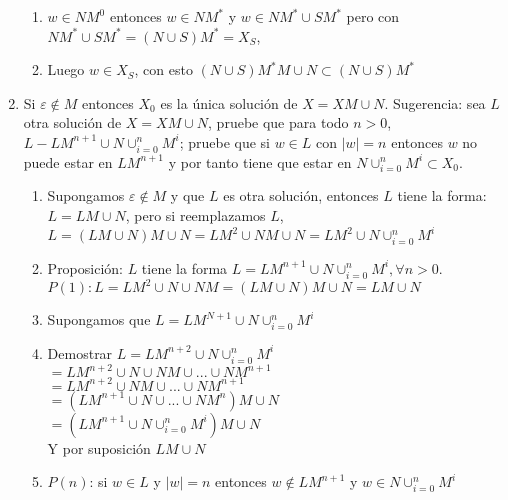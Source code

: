 \documentclass[a4paper, 12pt]{article}
\begin{document}
\begin{enumerate}
\begin{enumerate}[label = -]
        \item $w \in NM^{0}$ entonces $w \in NM^{*}$ y $w \in NM^{*} \cup SM^{*}$ pero con $NM^{*} \cup SM^{*} = (N \cup S)M^{*} = X_{S}$,

        \item Luego $w \in X_{S}$, con esto $(N \cup S)M^{*}M \cup N \subset (N \cup S)M^{*}$
    \end{enumerate}


    \vspace{0.5cm}
\item Si $\varepsilon \notin M$ entonces $X_{0}$ es la única solución de $X = XM \cup N$. Sugerencia: sea $L$ otra solución de $X = XM \cup N$, pruebe que para todo $n > 0$, $L - LM^{n + 1} \cup N \cup^{n}_{i = 0} M^{i}$; pruebe que si $w \in L$ con $|w| = n$ entonces $w$ no puede estar en $LM^{n + 1}$ y por tanto tiene que estar en $N \cup^{n}_{i = 0} M^{i} \subset X_{0}.$
    \begin{enumerate}[label = -]
        \item Supongamos $\varepsilon \notin M$ y que $L$ es otra solución, entonces $L$ tiene la forma:
        \\ $L = LM \cup N$, pero si reemplazamos $L$, $L = (LM \cup N)M \cup N = LM^{2} \cup NM \cup N = LM^{2} \cup N \cup^{n}_{i = 0}M^{i}$
        
        \item Proposición: $L$ tiene la forma $L = LM^{n + 1} \cup N \cup^{n}_{i = 0}M^{i}, \forall n > 0$.
        \\ $P(1): L = LM^{2} \cup N \cup NM = (LM \cup N)M \cup N = LM \cup N$

        \item Supongamos que $L = LM^{N + 1} \cup N \cup^{n}_{i = 0}M^{i}$
        
        \item Demostrar $L = LM^{n + 2} \cup N \cup^{n}_{i = 0}M^{i}$
        \\ $ = LM^{n + 2} \cup N \cup NM \cup ... \cup NM^{n + 1}$
        \\ $ = LM^{n + 2} \cup NM \cup ... \cup NM^{n + 1}$
        \\ $ = (LM^{n + 1} \cup N \cup ... \cup NM^{n})M \cup N$
        \\ $ = (LM^{n + 1} \cup N \cup^{n}_{i = 0}M^{i})M \cup N$
        \\ Y por suposición $LM \cup N$

        \item $P(n)$: si $w \in L$ y $|w| = n$ entonces $w \notin LM^{n + 1}$ y $w \in N  \cup^{n}_{i = 0}M^{i}$


\end{enumerate}
\end{enumerate}
\end{document}

